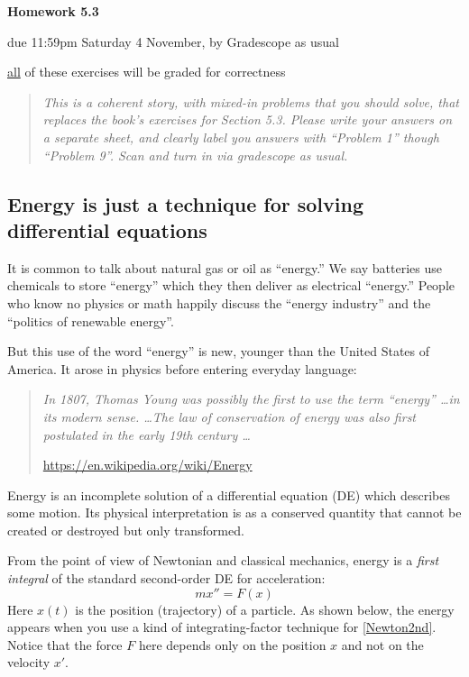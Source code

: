 \documentclass[12pt]{article}
\theoremstyle{definition}
\begin{document}
\renewcommand{\d}{\displaystyle}

\strut
\centerline{{\Large \textbf{Homework 5.3}}}

\bigskip
\centerline{{\large due 11:59pm Saturday 4 November, by Gradescope as usual}}

\bigskip
\centerline{{\large \underline{all} of these exercises will be graded for correctness}}

\begin{quote}
\emph{This is a coherent story, with mixed-in problems that you should solve, that replaces the book's exercises for Section 5.3.  Please write your answers on a separate sheet, and clearly label you answers with ``Problem 1'' though ``Problem 9''.  Scan and turn in via gradescope as usual.}
\end{quote}

\noindent
\subsection*{Energy is just a technique for solving differential equations}

It is common to talk about natural gas or oil as ``energy.''   We say batteries use chemicals to store ``energy'' which they then deliver as electrical ``energy.''  People who know no physics or math happily discuss the ``energy industry'' and the ``politics of renewable energy''.

But this use of the word ``energy'' is new, younger than the United States of America.  It arose in physics before entering everyday language:

\small

\begin{quotation}
\noindent \emph{In 1807, Thomas Young was possibly the first to use the term ``energy'' \dots in its modern sense.  \dots  The law of conservation of energy was also first postulated in the early 19th century \dots}

\hfill \url{https://en.wikipedia.org/wiki/Energy}
\end{quotation}

\normalsize
Energy is an incomplete solution of a differential equation (DE) which describes some motion.  Its physical interpretation is as a conserved quantity that cannot be created or destroyed but only transformed.

From the point of view of Newtonian and classical mechanics, energy is a \emph{first integral} of the standard second-order DE for acceleration:
\begin{equation}
    mx''=F(x)  \label{Newton2nd}
\end{equation}
Here $x(t)$ is the position (trajectory) of a particle.  As shown below, the energy appears when you use a kind of integrating-factor technique for \eqref{Newton2nd}.  Notice that the force $F$ here depends only on the position $x$ and not on the velocity $x'$.
\end{document}
